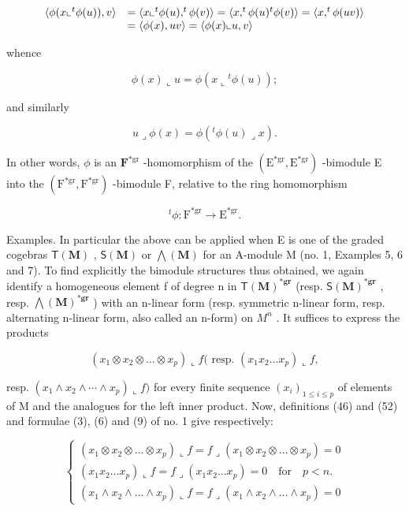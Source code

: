 \[
\begin{array}{r l} \langle \phi (x \llcorner {} ^ {t} \phi (u)), v \rangle & = \langle x \llcorner {} ^ {t} \phi (u), ^ {t} \phi (v) \rangle = \langle x, ^ {t} \phi (u) ^ {t} \phi (v) \rangle = \langle x, ^ {t} \phi (u v) \rangle \\ & = \langle \phi (x), u v \rangle = \langle \phi (x) \llcorner u, v \rangle \end{array}
\]

whence

\[
\phi (x) \llcorner u = \phi (x \llcorner {} ^ {t} \phi (u));\tag{55}
\]

and similarly

\[
u \lrcorner \phi (x) = \phi (^ {t} \phi (u) \lrcorner x).\tag{56}
\]

In other words, \(\phi\) is an \(\mathbf{F}^{*\mathrm{gr}}\) -homomorphism of the \((\mathrm{E}^{*\mathrm{gr}}, \mathrm{E}^{*\mathrm{gr}})\) -bimodule E into the \((\mathrm{F}^{*\mathrm{gr}}, \mathrm{F}^{*\mathrm{gr}})\) -bimodule F, relative to the ring homomorphism

\[
{ } ^ { t } \phi : \mathrm{F} ^ { * \mathrm{gr} } \rightarrow \mathrm{E} ^ { * \mathrm{gr} } .
\]

Examples. In particular the above can be applied when E is one of the graded cogebras \(\mathsf{T}(\mathbf{M})\) , \(\mathsf{S}(\mathbf{M})\) or \(\bigwedge(\mathbf{M})\) for an A-module M (no. 1, Examples 5, 6 and 7). To find explicitly the bimodule structures thus obtained, we again identify a homogeneous element f of degree n in \(\mathsf{T}(\mathbf{M})^{*\mathbf{g}\mathbf{r}}\) (resp. \(\mathsf{S}(\mathbf{M})^{*\mathbf{g}\mathbf{r}}\) , resp. \(\bigwedge(\mathbf{M})^{*\mathbf{g}\mathbf{r}}\) ) with an n-linear form (resp. symmetric n-linear form, resp. alternating n-linear form, also called an n-form) on \(M^{n}\) . It suffices to express the products

\[
\left(x _ {1} \otimes x _ {2} \otimes \dots \otimes x _ {p}\right) \llcorner f (\text { resp. } (x _ {1} x _ {2} \dots x _ {p}) \llcorner f,
\]

resp. \((x_{1} \wedge x_{2} \wedge \cdots \wedge x_{p}) \llcorner f)\) for every finite sequence \((x_{i})_{1 \leqslant i \leqslant p}\) of elements of M and the analogues for the left inner product. Now, definitions (46) and (52) and formulae (3), (6) and (9) of no. 1 give respectively:

\[
\left\{ \begin{array}{l} (x _ {1} \otimes x _ {2} \otimes \dots \otimes x _ {p}) \llcorner f = f \lrcorner (x _ {1} \otimes x _ {2} \otimes \dots \otimes x _ {p}) = 0 \\ (x _ {1} x _ {2} \ldots x _ {p}) \llcorner f = f \lrcorner (x _ {1} x _ {2} \ldots x _ {p}) = 0 \quad \text {for} \quad p <   n. \\ (x _ {1} \wedge x _ {2} \wedge \dots \wedge x _ {p}) \llcorner f = f \lrcorner (x _ {1} \wedge x _ {2} \wedge \dots \wedge x _ {p}) = 0 \end{array} \right.\tag{57}
\]

